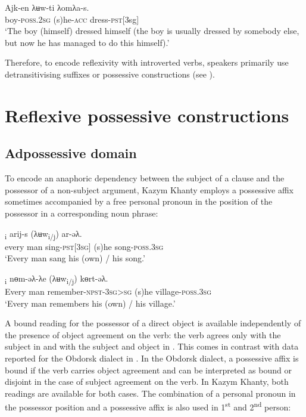 \documentclass[output=paper]{langscibook}
\begin{document}
\ea 
\label{ex:Volkova:54}
 \gll Ajk-en  λʉw-ti λomλa-s.\\
 boy\textsc{{}-poss.2sg} (s)he\textsc{{}-acc} dress\textsc{{}-pst[}3sg]\\
 \glt ‘The boy (himself) dressed himself (the boy is usually dressed by somebody else, but now he has managed to do this himself).’
\z


Therefore, to encode reflexivity with introverted verbs, speakers primarily use detransitivising suffixes or possessive constructions (see ).

\section{{Reflexive} {possessive} {constructions}}\label{sec:Volkova:6}
\subsection{{Adpossessive} {domain}}\label{sec:Volkova:6.1}

To encode an anaphoric dependency between the subject of a clause and the possessor of a non-subject argument, Kazym Khanty employs a possessive affix sometimes accompanied by a free personal pronoun in the position of the possessor in a corresponding noun phrase:

\ea 
\label{ex:Volkova:55}
	\ea
	\label{ex:Volkova:55a}
  	 \textsubscript{i} arij-s (λʉw\textsubscript{i/j}) ar-əλ.\\
  	 every man sing\textsc{{}-pst[3sg]} (s)he song\textsc{{}-poss.3sg}\\
  	 \glt ‘Every man sang his (own) / his song.’

	\ex
	\label{ex:Volkova:55b}
  	 \textsubscript{i} nɵm-əλ-λe  (λʉw\textsubscript{i/j}) kɵrt-əλ.\\
  	 Every man remember\textsc{{}-npst-3sg>sg} (s)he village\textsc{{}-poss.3sg}\\
  	 \glt ‘Every man remembers his\textsubscript{} (own) / his village.’
	\z
\z

A bound reading for the possessor of a direct object is available independently of the presence of object agreement on the verb: the verb agrees only with the subject in  and with the subject and object in . This comes in contrast with data reported for the Obdorsk dialect in \citep{Nikolaeva1999Ostyak}. In the Obdorsk dialect, a possessive affix is bound if the verb carries object agreement and can be interpreted as bound or disjoint in the case of subject agreement on the verb. In Kazym Khanty, both readings are available for both cases. The combination of a personal pronoun in the possessor position and a possessive affix is also used in 1\textsuperscript{st} and 2\textsuperscript{nd} person: 
\end{document}
